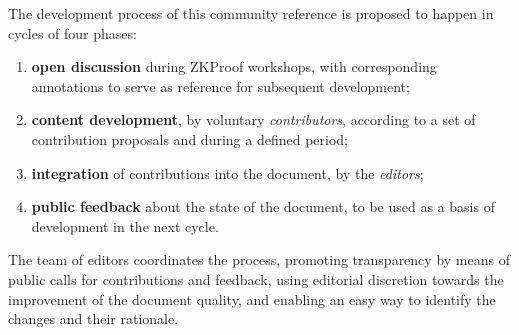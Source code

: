 The development process of this community reference is proposed to happen in cycles of four phases:
\begin{enumerate}[label=(\roman*),itemsep=0ex]
	\item \textbf{open discussion} during ZKProof workshops, with corresponding annotations to serve as reference for subsequent development;
	\item \textbf{content development}, by voluntary \emph{contributors}, according to a set of contribution proposals and during a defined period;
	\item \textbf{integration} of contributions into the document, by the \emph{editors}; 
	\item \textbf{public feedback} about the state of the document, to be used as a basis of development in the next cycle.
\end{enumerate}

The team of editors coordinates the process, promoting transparency by means of public calls for contributions and feedback, using editorial discretion towards the improvement of the document quality, and enabling an easy way to identify the changes and their rationale.
